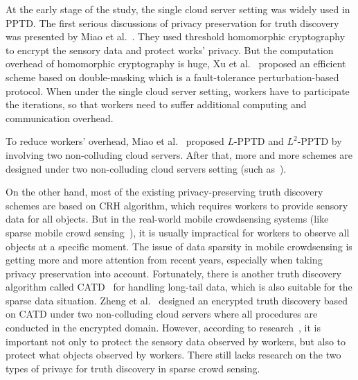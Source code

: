 \documentclass[conference]{IEEEtran}
\begin{document}
At the early stage of the study, the single cloud server setting was widely used in PPTD.
The first serious discussions of privacy preservation for truth discovery was presented by Miao et al.~\cite{miao_cloud-enabled_2015}.
They used threshold homomorphic cryptography to encrypt the sensory data and protect works' privacy. 
But the computation overhead of homomorphic cryptography is huge, Xu et al.~\cite{xu_efficient_2019} proposed an efficient scheme based on double-masking which is a fault-tolerance perturbation-based protocol.
When under the single cloud server setting, workers have to participate the iterations, so that workers need to suffer additional computing and communication overhead.

To reduce workers' overhead, Miao et al.~\cite{miao_lightweight_2017} proposed $L$-PPTD and $L^2$-PPTD by involving two non-colluding cloud servers.
After that, more and more schemes are designed under two non-colluding cloud servers setting (such as~\cite{zhang_lptd_2019,zhang_reliable_2019,xue_inpptd_2020,tang_achieving_2021}).

On the other hand, most of the existing privacy-preserving truth discovery schemes are based on CRH algorithm, which requires workers to provide sensory data for all objects.
But in the real-world mobile crowdsensing systems (like sparse mobile crowd sensing~\cite{wang_sparse_2016}), it is usually impractical for workers to observe all objects at a specific moment.
The issue of data sparsity in mobile crowdsensing is getting more and more attention from recent years, especially when taking privacy preservation into account.
Fortunately, there is another truth discovery algorithm called CATD~\cite{li_confidence-aware_2014} for handling long-tail data, which is also suitable for the sparse data situation.
Zheng et al.~\cite{zheng_learning_2018} designed an encrypted truth discovery based on CATD under two non-colluding cloud servers where all procedures are conducted in the encrypted domain.
However, according to research~\cite{wang_sparse_2020}, it is important not only to protect the sensory data observed by workers, but also to protect what objects observed by workers.
There still lacks research on the two types of privayc for truth discovery in sparse crowd sensing.
\end{document}
